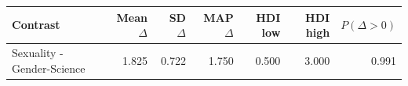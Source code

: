\begin{tabular}{lrrrrrr}
\toprule
Contrast & Mean $\Delta$ & SD $\Delta$ & MAP $\Delta$ & HDI low & HDI high & $P(\Delta>0)$ \\
\midrule
Sexuality - Gender-Science & 1.825 & 0.722 & 1.750 & 0.500 & 3.000 & 0.991 \\
\bottomrule
\end{tabular}
